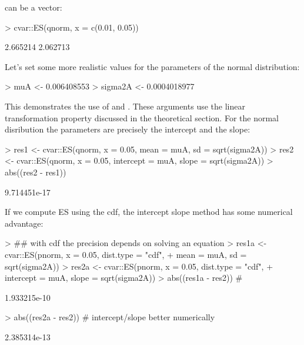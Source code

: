 \documentclass[nojss,article]{jss}
\begin{document}
 can be a vector:
\begin{Schunk}
\begin{Sinput}
> cvar::ES(qnorm, x = c(0.01, 0.05))
\end{Sinput}
\begin{Soutput}
[1] 2.665214 2.062713
\end{Soutput}
\end{Schunk}

Let's set some more realistic values for the parameters of the normal distribution:
\begin{Schunk}
\begin{Sinput}
> muA <- 0.006408553
> sigma2A <- 0.0004018977
\end{Sinput}
\end{Schunk}

This demonstrates the use of  and . These arguments use the
linear transformation property discussed in the theoretical section. For the normal
disribution the parameters are precisely the intercept and the slope:
\begin{Schunk}
\begin{Sinput}
> res1 <- cvar::ES(qnorm, x = 0.05, mean = muA, sd = sqrt(sigma2A))
> res2 <- cvar::ES(qnorm, x = 0.05, intercept = muA, slope = sqrt(sigma2A))
> abs((res2 - res1)) 
\end{Sinput}
\begin{Soutput}
[1] 9.714451e-17
\end{Soutput}
\end{Schunk}

If we compute ES using the cdf, the intercept slope method has some numerical advantage:
\begin{Schunk}
\begin{Sinput}
> ## with cdf the precision depends on solving an equation
> res1a <- cvar::ES(pnorm, x = 0.05, dist.type = "cdf",
+                    mean = muA, sd = sqrt(sigma2A))
> res2a <- cvar::ES(pnorm, x = 0.05, dist.type = "cdf",
+                    intercept = muA, slope = sqrt(sigma2A))
> abs((res1a - res2)) # 
\end{Sinput}
\begin{Soutput}
[1] 1.933215e-10
\end{Soutput}
\begin{Sinput}
> abs((res2a - res2)) # intercept/slope better numerically
\end{Sinput}
\begin{Soutput}
[1] 2.385314e-13
\end{Soutput}
\end{Schunk}
\end{document}
